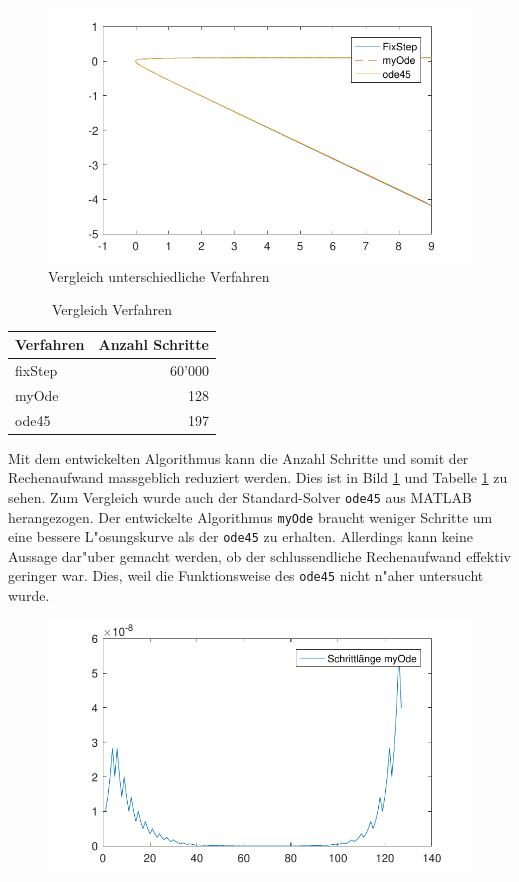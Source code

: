 \begin{refsection}
\begin{figure}
\centering
\includegraphics{schrittlaenge/images/vergleichVerfahren.pdf}
\caption{Vergleich unterschiedliche Verfahren}
\label{image:vergleichVerfahren}
\end{figure}
\begin{table}
\centering
\begin{tabular}{|l|r|}
\hline
Verfahren & Anzahl Schritte\\ \hline
fixStep & 60'000\\
myOde & 128\\
ode45 & 197\\
\end{tabular}
\caption{Vergleich Verfahren}
\label{table:vergleichVerfahren}
\end{table}
Mit dem entwickelten Algorithmus kann die Anzahl Schritte und somit der Rechenaufwand massgeblich reduziert werden.
Dies ist in Bild \ref{image:vergleichVerfahren} und Tabelle \ref{table:vergleichVerfahren} zu sehen.
Zum Vergleich wurde auch der Standard-Solver \texttt{ode45} aus MATLAB herangezogen.
Der entwickelte Algorithmus \texttt{myOde} braucht weniger Schritte um eine bessere L"osungskurve als der \texttt{ode45} zu erhalten.
Allerdings kann keine Aussage dar"uber gemacht werden, ob der schlussendliche Rechenaufwand effektiv geringer war.
Dies, weil die Funktionsweise des \texttt{ode45} nicht n"aher untersucht wurde.
\begin{figure}
\centering
\includegraphics{schrittlaenge/images/verlaufSchrittlaenge.pdf}

\end{figure}
\end{refsection}

